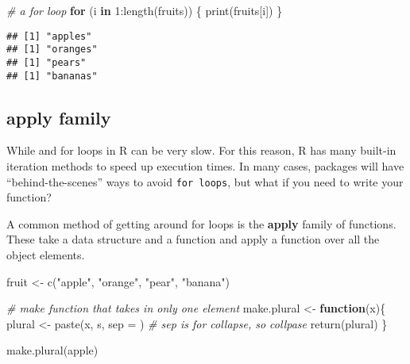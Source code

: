 \documentclass[
]{book}
\newenvironment{Shaded}{\begin{snugshade}}{\end{snugshade}}
\newcommand{\AttributeTok}[1]{\textcolor[rgb]{0.77,0.63,0.00}{#1}}
\newcommand{\CommentTok}[1]{\textcolor[rgb]{0.56,0.35,0.01}{\textit{#1}}}
\newcommand{\ControlFlowTok}[1]{\textcolor[rgb]{0.13,0.29,0.53}{\textbf{#1}}}
\newcommand{\DecValTok}[1]{\textcolor[rgb]{0.00,0.00,0.81}{#1}}
\newcommand{\FunctionTok}[1]{\textcolor[rgb]{0.00,0.00,0.00}{#1}}
\newcommand{\NormalTok}[1]{#1}
\newcommand{\OtherTok}[1]{\textcolor[rgb]{0.56,0.35,0.01}{#1}}
\newcommand{\SpecialCharTok}[1]{\textcolor[rgb]{0.00,0.00,0.00}{#1}}
\newcommand{\StringTok}[1]{\textcolor[rgb]{0.31,0.60,0.02}{#1}}
\begin{document}
\begin{Shaded}
\begin{Highlighting}[]
\CommentTok{\# a for loop}
\ControlFlowTok{for}\NormalTok{ (i }\ControlFlowTok{in} \DecValTok{1}\SpecialCharTok{:}\FunctionTok{length}\NormalTok{(fruits)) \{}
  \FunctionTok{print}\NormalTok{(fruits[i])}
\NormalTok{\}}
\end{Highlighting}
\end{Shaded}

\begin{verbatim}
## [1] "apples"
## [1] "oranges"
## [1] "pears"
## [1] "bananas"
\end{verbatim}

\hypertarget{apply-family}{%
\subsection{apply family}\label{apply-family}}

While and for loops in R can be very slow. For this reason, R has many built-in iteration methods to speed up execution times. In many cases, packages will have ``behind-the-scenes'' ways to avoid \texttt{for\ loops}, but what if you need to write your function?

A common method of getting around for loops is the \textbf{apply} family of functions. These take a data structure and a function and apply a function over all the object elements.

\begin{Shaded}
\begin{Highlighting}[]
\NormalTok{fruit }\OtherTok{\textless{}{-}} \FunctionTok{c}\NormalTok{(}\StringTok{"apple"}\NormalTok{, }\StringTok{"orange"}\NormalTok{, }\StringTok{"pear"}\NormalTok{, }\StringTok{"banana"}\NormalTok{)}

\CommentTok{\# make function that takes in only one element}
\NormalTok{make.plural }\OtherTok{\textless{}{-}} \ControlFlowTok{function}\NormalTok{(x)\{}
\NormalTok{   plural }\OtherTok{\textless{}{-}} \FunctionTok{paste}\NormalTok{(x, }\StringTok{\textquotesingle{}s\textquotesingle{}}\NormalTok{, }\AttributeTok{sep =} \StringTok{\textquotesingle{}\textquotesingle{}}\NormalTok{) }\CommentTok{\# sep is for collapse, so collpase \textquotesingle{}\textquotesingle{}}
   \FunctionTok{return}\NormalTok{(plural)}
\NormalTok{\}}

\FunctionTok{make.plural}\NormalTok{(}\StringTok{\textquotesingle{}apple\textquotesingle{}}\NormalTok{)}
\end{Highlighting}
\end{Shaded}
\end{document}
